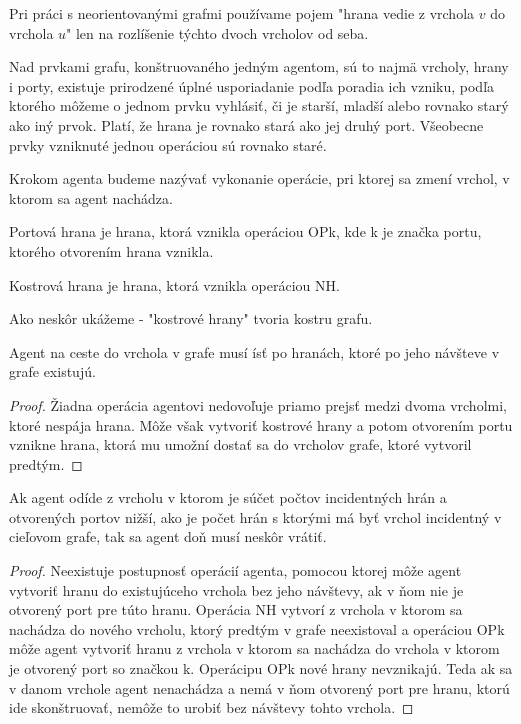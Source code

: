 \begin{pozn}
Pri práci s neorientovanými grafmi používame pojem "hrana vedie z vrchola
$v$
do vrchola $u$" len na rozlíšenie týchto dvoch vrcholov od seba.
\end{pozn}

\begin{ozn}
Nad prvkami grafu, konštruovaného jedným agentom,
  sú to najmä vrcholy, hrany i porty, existuje prirodzené úplné
usporiadanie podľa poradia ich vzniku, podľa ktorého môžeme o jednom prvku
vyhlásiť, či je starší, mladší alebo rovnako starý ako iný prvok. Platí, že
hrana je rovnako stará ako jej druhý port. Všeobecne prvky vzniknuté jednou
operáciou sú rovnako staré.
\end{ozn}

\begin{ozn}
Krokom agenta budeme nazývať vykonanie operácie, pri ktorej sa zmení vrchol,
v ktorom sa agent nachádza.
\end{ozn}

\begin{ozn}
Portová hrana je hrana, ktorá vznikla operáciou OPk, kde k je značka portu,
ktorého otvorením hrana vznikla.
\end{ozn}
\begin{ozn}
Kostrová hrana je hrana, ktorá vznikla operáciou NH.
\end{ozn}
\begin{pozn}
Ako neskôr ukážeme - "kostrové hrany" tvoria kostru grafu.
\end{pozn}

\begin{lem}
Agent na ceste do vrchola v grafe musí ísť po hranách, ktoré po jeho
návšteve v grafe existujú.
\end{lem}

\begin{proof}
Žiadna operácia agentovi nedovoľuje priamo prejsť medzi dvoma vrcholmi, ktoré
nespája hrana. Môže však vytvoriť kostrové hrany a potom otvorením portu
vznikne hrana, ktorá mu umožní dostať sa do vrcholov grafe, ktoré vytvoril
predtým.
\end{proof}

\begin{lem}
Ak agent odíde z vrcholu v ktorom je súčet počtov incidentných hrán a
otvorených portov nižší, ako je počet hrán s ktorými má byť vrchol
incidentný v cieľovom grafe, tak sa agent doň musí neskôr vrátiť.
\end{lem}

\begin{proof}
Neexistuje postupnosť operácií agenta, pomocou ktorej môže agent vytvoriť
hranu do
existujúceho vrchola bez jeho návštevy, ak v ňom nie je otvorený port pre
túto hranu. Operácia NH vytvorí z vrchola v ktorom sa nachádza do nového
vrcholu, ktorý predtým v grafe neexistoval a operáciou OPk môže agent
vytvoriť hranu z vrchola v ktorom sa nachádza do vrchola v ktorom je
otvorený port so značkou k. Operácipu OPk nové hrany nevznikajú. Teda ak sa
v danom vrchole agent nenachádza a nemá v ňom otvorený port pre hranu,
ktorú ide skonštruovať, nemôže to urobiť bez návštevy tohto vrchola.
\end{proof}

